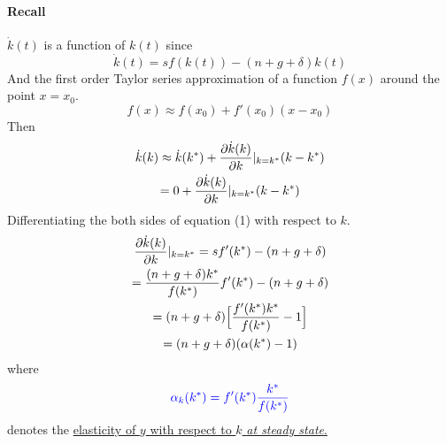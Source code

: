 \documentclass[11pt]{article}
\begin{document}
	    \paragraph{Recall} $\dot{k}(t)$ is a function of $k(t)$ since 
	    \begin{equation}
	        \dot{k}(t) = sf(k(t)) - (n+g+\delta)k(t)
	    \end{equation}
	    And the first order Taylor series approximation of a function $f(x)$ around the point $x = x_0$.
	    \[
	        f(x) \approx f(x_0) + f'(x_0)(x - x_0)
	    \]
	    Then
	    \begin{gather}
	        \dot{k}(k) \approx \dot{k}(k^*) + \frac{\partial{\dot{k}(k)}}{\partial{k}}|_{k=k^*} (k - k^*) \\
	        = 0 + \frac{\partial{\dot{k}(k)}}{\partial{k}}|_{k=k^*} (k - k^*)
	    \end{gather}
	    Differentiating the both sides of equation (1) with respect to $k$.
	    \begin{gather}
	        \frac{\partial{\dot{k}(k)}}{\partial{k}}|_{k=k^*} = sf'(k^*) - (n + g + \delta) \\
	        = \frac{(n + g + \delta) k^*}{f(k^*)} f'(k^*) - (n + g + \delta) \\
	        = (n + g + \delta) \Big [
	            \frac{f'(k^*) k^*}{f(k^*)} - 1
	            \Big ] \\
	        = (n + g + \delta) (\alpha (k^*) - 1)
	    \end{gather}
	    where 
	    \begin{equation}
	    \textcolor{blue}{
	        \alpha_k (k^*) = f'(k^*)\frac{k^*}{f(k^*)}
	        }
	    \end{equation}
	    denotes the \ul{elasticity of $y$ with respect to $k$ \emph{at steady state}.}
	    
\end{document}
